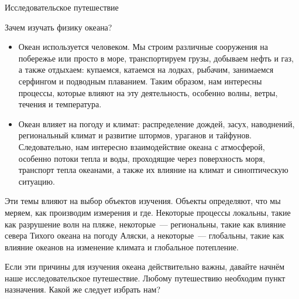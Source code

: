 \begin{chapter}{Исследовательское путешествие}
\begin{section}{Зачем изучать физику океана?}
\begin{itemize}
\item
Океан используется человеком. Мы строим различные сооружения на побережье 
или просто в море, транспортируем грузы, добываем нефть и газ, а также 
отдыхаем: купаемся, катаемся на лодках, рыбачим, занимаемся серфингом 
и подводным плаванием. Таким образом, нам интересны процессы, которые 
влияют на эту деятельность, особенно волны, ветры, течения и температура.
%

\item
Океан влияет на погоду и климат: распределение дождей, засух, 
наводнений, региональный климат и развитие штормов, ураганов и тайфунов. 
Следовательно, нам интересно взаимодействие океана с атмосферой, 
особенно потоки тепла и воды, проходящие через поверхность моря, 
транспорт тепла океанами, а также их влияние на климат и синоптическую 
ситуацию.
%
\end{itemize}

Эти темы влияют на выбор объектов изучения. Объекты определяют, что мы меряем, 
как производим измерения и где. Некоторые процессы локальны, такие как 
разрушение волн на пляже, некоторые~--- региональны, такие как влияние севера 
Тихого океана на погоду Аляски, а некоторые~--- глобальны, такие как влияние 
океанов на изменение климата и глобальное потепление.
%
 
Если эти причины для изучения океана действительно важны, давайте начнём 
наше исследовательское путешествие. Любому путешествию необходим пункт 
назначения. Какой же следует избрать нам?
%
\end{section}


\end{chapter}
